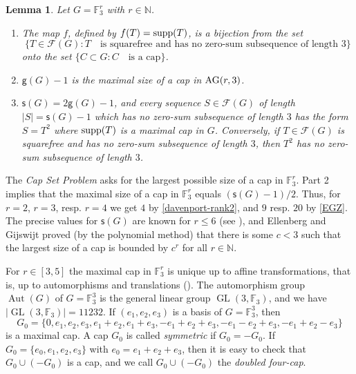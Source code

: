\documentclass[a4paper, 10pt]{amsart}
\theoremstyle{plain}
\newtheorem{lemma}[theorem]{\bf Lemma}
\theoremstyle{definition}
\theoremstyle{definition}
\newcommand{\N}{\mathbb N}
\newcommand{\F}{\mathbb F}
\DeclareMathOperator{\Aut}{Aut} \DeclareMathOperator{\GL}{GL}
\numberwithin{equation}{section}
\begin{document}
\begin{lemma} \label{2.6}
Let $G = \F_3^r$ with $r \in \N$.
\begin{enumerate}
\item The map $f$, defined by $f (T) = \operatorname{supp} (T)$, is a bijection
       from the set
       \[
       \{ T \in \mathcal F ( G ) \colon T \quad \text{is
       squarefree and has no zero-sum subsequence of length $3$}
       \}
       \]
       onto the set $\{ C \subset G \colon C \quad
       \text{is a cap} \}$.


\smallskip
\item $\mathsf g ( G ) - 1$ is the maximal size of a
       cap in $\operatorname{AG} (r,3)$.
\smallskip
\item $\mathsf s ( G ) = 2 \mathsf g ( G )-1$, and every
       sequence $S \in \mathcal  F ( G )$ of length
       $|S| = \mathsf s ( G ) - 1$ which has
       no zero-sum subsequence
       of length $3$ has
       the form $S = T^2$ where $\operatorname{supp} (T)$ is a maximal cap in
       $G$. Conversely, if $T \in \mathcal F ( G )$ is squarefree
       and has no zero-sum subsequence of
       length $3$, then $T^2$ has no zero-sum subsequence of length
       $3$.
\end{enumerate}
\end{lemma}

The {\it Cap Set Problem} asks for the largest possible size of a cap in $\F_3^r$.
Part 2 implies that the maximal size of a cap in $\F_3^r$ equals $(\mathsf s (G)-1)/2$. Thus, for $r=2$, $r=3$, resp. $r=4$ we get $4$ by \eqref{davenport-rank2}, and  $9$ resp. $20$ by \eqref{EGZ}. The precise values for $\mathsf s (G)$ are known for $r \le 6$ (see \cite{E-F-L-S02,Po08a}), and 
Ellenberg and Gijswijt \cite{El-Gi17a} proved (by the polynomial method) that there is some $c < 3$ such that the largest size of a cap is bounded by $c^r$ for  all $r \in \N$.

For $r \in [3,5]$ the maximal cap in $\F_3^r$ is unique up to affine transformations, that is, up to automorphisms and translations (\cite[Lemma 5.4]{E-E-G-K-R07}). The automorphism group $\Aut (G)$ of $G = \F_3^3$ is the general linear group $\GL (3, \F_3)$, and we have $|\GL (3, \F_3)|= 11232$. If $(e_1, e_2,e_3)$ is a basis of $G =\F_3^3$, then
\[
G_0 = \{0, e_1,e_2,e_3,  e_1+e_2, e_1+e_3, -e_1+e_2+e_3, -e_1-e_2+e_3, -e_1+e_2-e_3\}
\]
is a maximal cap. A cap $G_0$ is called \emph{symmetric} if
$G_0 = -G_0$.
If $G_0 = \{e_0,e_1,e_2,e_3\}$ with $e_0=e_1+e_2+e_3$,  then it is easy to check that
$G_0 \cup (-G_0)$ is a cap, and we call $G_0 \cup (-G_0)$ the
\emph{doubled four-cap}.  
\end{document}
